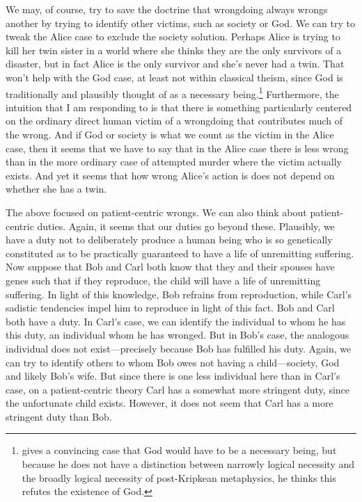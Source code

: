 We may, of course, try to save the doctrine that wrongdoing always wrongs another by trying to identify other victims, such as 
society or God. We can try to tweak the Alice case to exclude the society solution. Perhaps Alice is trying to kill her twin sister
in a world where she thinks they are the only survivors of a disaster, but in fact Alice is the only survivor and she's never had a
twin. That won't help with the God case, at least not within classical theism, since God is traditionally and plausibly thought of as a necessary 
being.\footnote{ gives a convincing case that God would have to be a necessary being, but 
because he does not have a distinction between narrowly logical necessity and the broadly logical necessity of
post-Kripkean metaphysics, he thinks this refutes the existence of God.}
 Furthermore, the intuition that I am responding to is that there is something particularly centered
on the ordinary direct human victim of a wrongdoing that contributes much of the wrong. And if God or society is what we count as 
the victim in the Alice case, then it seems that we have to say that in the Alice case there is less wrong than in the more ordinary
case of attempted murder where the victim actually exists. And yet it seems that how wrong Alice's action is does not depend on whether
she has a twin.

The above focused on patient-centric wrongs. We can also think about patient-centric duties. Again, it seems that our duties go 
beyond these. Plausibly, we have a duty not to deliberately produce a human being who is so genetically constituted as to be 
practically guaranteed to have a life of unremitting suffering. Now suppose that Bob and Carl both know that they and their 
spouses have genes such that if they reproduce, the child will have a life of unremitting suffering. In light of this knowledge,
Bob refrains from reproduction, while Carl's sadistic tendencies impel him to reproduce in light of this fact. Bob and Carl both
have a duty. In Carl's case, we can identify the individual to whom he has this duty, an individual whom he has wronged.
But in Bob's case, the analogous individual does not exist---precisely because Bob has fulfilled his duty. Again, we can try to
identify others to whom Bob owes not having a child---society, God and likely Bob's wife. But since there is one less individual
here than in Carl's case, on a patient-centric theory Carl has a somewhat more stringent duty, since the unfortunate child exists. However, it does not seem
that Carl has a more stringent duty than Bob.

